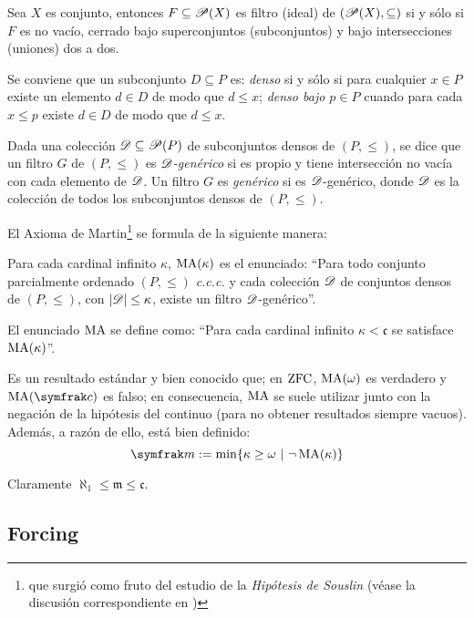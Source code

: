     \begin{observacion}\label{obs-filtr-potencia}
        Sea $X$ es conjunto, entonces $F \subseteq \mathscr{P}(X)$ es filtro (ideal) de $(\mathscr{P}(X),\subseteq)$ si y sólo si $F$ es no vacío, cerrado bajo superconjuntos (subconjuntos) y bajo intersecciones (uniones) dos a dos.
    \end{observacion}

    Se conviene que un subconjunto $D \subseteq P$ es: \textit{denso} si y sólo si para cualquier $x \in P$ existe un elemento $d \in D$ de modo que $d \leq x$; \textit{denso bajo $p \in P$} cuando para cada $x \leq p$ existe $d \in D$ de modo que $d \leq x$.

    Dada una colección $\mathscr{D} \subseteq \mathscr{P}(P)$ de subconjuntos densos de $(P,\leq)$, se dice que un filtro $G$ de $(P,\leq)$ es \textit{$\mathscr{D}$-genérico} si es propio y tiene intersección no vacía con cada elemento de $\mathscr{D}$. Un filtro $G$ es \textit{genérico} si es $\mathscr{D}$-genérico, donde $\mathscr{D}$ es la colección de todos los subconjuntos densos de $(P,\leq)$.

    El Axioma de Martin\footnote{que surgió como fruto del estudio de la \textit{Hipótesis de Souslin} (véase la discusión correspondiente en \cite{kunenSet})} se formula de la siguiente manera:
    \begin{definicion}\label{def-AxMartin}\index[sym]{$\Ma(\kappa)$}\index[sym]{$\Ma$}
        Para cada cardinal infinito $\kappa$, $\Ma(\kappa)$ es el enunciado: ``Para todo conjunto parcialmente ordenado $(P,\leq)$ \textit{c.c.c.} y cada colección $\mathscr{D}$ de conjuntos densos de $(P,\leq)$, con $|\mathscr{D}|\leq \kappa$, existe un filtro $\mathscr{D}$-genérico''.

        El enunciado $\Ma$ se define como: ``Para cada cardinal infinito $\kappa<\mathfrak{c}$ se satisface $\Ma(\kappa)$''.
    \end{definicion}

    Es un resultado estándar y bien conocido que; en $\operatorname{ZFC}$, $\operatorname{MA}(\omega)$ es verdadero y $\Ma(\mathfrak{c})$ es falso; en consecuencia, $\Ma$ se suele utilizar junto con la negación de la hipótesis del continuo (para no obtener resultados siempre vacuos). Además, a razón de ello, está bien definido:
    $$ \mathfrak{m}:=\min\{ \kappa \geq \omega \tq \lnot \Ma(\kappa) \} $$

    Claramente $\aleph_1 \leq \mathfrak{m} \leq \mathfrak{c}$.

    \subsection{Forcing}
